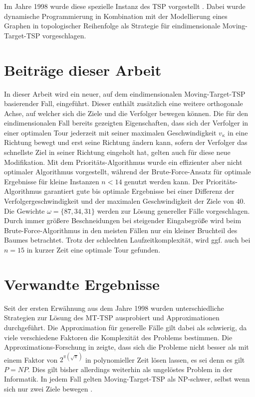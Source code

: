 \documentclass[german,version-2019-11]{uzl-thesis}
\begin{document}
Im Jahre 1998 wurde diese spezielle Instanz des TSP vorgestellt \cite{helvig}. Dabei wurde dynamische Programmierung  \cite{kunzi2013einfuhrungskursus} in Kombination mit der Modellierung eines Graphen in topologischer Reihenfolge als Strategie für eindimensionale Moving-Target-TSP vorgeschlagen.

\section{Beiträge dieser Arbeit}

In dieser Arbeit wird ein neuer, auf dem eindimensionalen Moving-Target-TSP basierender Fall, eingeführt. Dieser enthält zusätzlich eine weitere orthogonale Achse, auf welcher sich die Ziele und die Verfolger bewegen können. Die für den eindimensionalen Fall bereits gezeigten Eigenschaften, dass sich der Verfolger in einer optimalen Tour jederzeit mit seiner maximalen Geschwindigkeit $v_{\kappa}$ in eine Richtung bewegt und erst seine Richtung ändern kann, sofern der Verfolger das schnellste Ziel in seiner Richtung eingeholt hat, gelten auch für diese neue Modifikation. Mit dem Prioritäts-Algorithmus wurde ein effizienter aber nicht optimaler Algorithmus vorgestellt, während der Brute-Force-Ansatz für optimale Ergebnisse für kleine Instanzen $n<14$ genutzt werden kann. Der Prioritäts-Algorithmus garantiert gute bis optimale Ergebnisse bei einer Differenz der Verfolgergeschwindigkeit und der maximalen Geschwindigkeit der Ziele von 40. Die Gewichte $\omega=\{87,34,31\}$ werden zur Lösung genereller Fälle vorgeschlagen. Durch immer größere Beschneidungen bei steigender Eingabegröße wird beim Brute-Force-Algorithmus in den meisten Fällen nur ein kleiner Bruchteil des Baumes betrachtet. Trotz der schlechten Laufzeitkomplexität, wird ggf. auch bei $n=15$ in kurzer Zeit eine optimale Tour gefunden.


\section{Verwandte Ergebnisse}

Seit der ersten Erwähnung aus dem Jahre 1998 wurden unterschiedliche Strategien zur Lösung des MT-TSP ausprobiert und Approximationen durchgeführt. Die Approximation für generelle Fälle gilt dabei als schwierig, da viele verschiedene Faktoren die Komplexität des Problems bestimmen. Die Approximations-Forschung in \cite{hammar} zeigte, dass sich die Probleme nicht besser als mit einem Faktor von $2^{\pi(\sqrt{\pi})}$ in polynomieller Zeit lösen lassen, es sei denn es gilt $P=NP$. Dies gilt bisher allerdings weiterhin als ungelöstes Problem in der Informatik. In jedem Fall gelten Moving-Target-TSP als NP-schwer, selbst wenn sich nur zwei Ziele bewegen \cite{hammar}.
\end{document}
